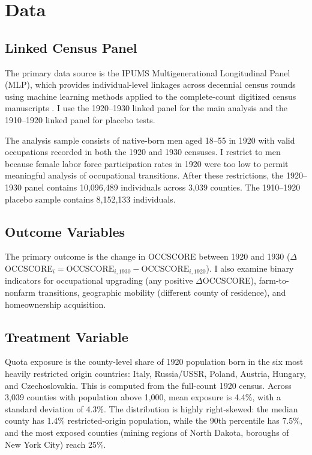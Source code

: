 \documentclass[12pt]{article}
\begin{document}
\section{Data}
\label{sec:data}

\subsection{Linked Census Panel}

The primary data source is the IPUMS Multigenerational Longitudinal Panel (MLP), which provides individual-level linkages across decennial census rounds using machine learning methods applied to the complete-count digitized census manuscripts \citep{ruggles2024ipums, helgertz2023ipums}.  I use the 1920--1930 linked panel for the main analysis and the 1910--1920 linked panel for placebo tests.

The analysis sample consists of native-born men aged 18--55 in 1920 with valid occupations recorded in both the 1920 and 1930 censuses.  I restrict to men because female labor force participation rates in 1920 were too low to permit meaningful analysis of occupational transitions.  After these restrictions, the 1920--1930 panel contains 10,096,489 individuals across 3,039 counties.  The 1910--1920 placebo sample contains 8,152,133 individuals.

\subsection{Outcome Variables}

The primary outcome is the change in OCCSCORE between 1920 and 1930 ($\Delta$OCCSCORE$_i = \text{OCCSCORE}_{i,1930} - \text{OCCSCORE}_{i,1920}$).  I also examine binary indicators for occupational upgrading (any positive $\Delta$OCCSCORE), farm-to-nonfarm transitions, geographic mobility (different county of residence), and homeownership acquisition.

\subsection{Treatment Variable}

Quota exposure is the county-level share of 1920 population born in the six most heavily restricted origin countries: Italy, Russia/USSR, Poland, Austria, Hungary, and Czechoslovakia.  This is computed from the full-count 1920 census.  Across 3,039 counties with population above 1,000, mean exposure is 4.4\%, with a standard deviation of 4.3\%.  The distribution is highly right-skewed: the median county has 1.4\% restricted-origin population, while the 90th percentile has 7.5\%, and the most exposed counties (mining regions of North Dakota, boroughs of New York City) reach 25\%.
\end{document}
